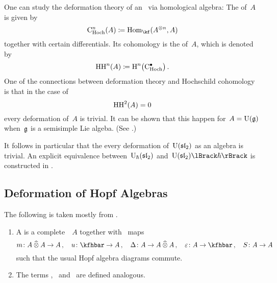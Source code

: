 \documentclass[a4paper, 11pt, oneside]{scrartcl}
\begin{document}
\begin{remark}
  One can study the deformation theory of an~\algebra{$\kf$} via homological algebra:
  The  of~$A$ is given by
  \[
    \CHoch^n(A)
    \defined
    \Hom_{\kf}(A^{\tensor n}, A)
  \]
  together with certain differentials.
  Its cohomology is the  of~$A$, which is denoted by
  \[
    \HH^n(A)
    \defined
    \Homology^n\bigl( \CHoch^\bullet \bigr) \,.
  \]
  One of the connections between deformation theory and Hochschild cohomology is that in the case of
  \[
    \operatorname{HH}^2(A) = 0
  \]
  every deformation of~$A$ is trivial.
  It can be shown that this happen for~$A = \operatorname{U}(\mathfrak{g})$ when~$\mathfrak{g}$ is a semisimple Lie algeba.
  (See \cite[Theorem~2]{gerstenhaber_quantum}.)

  It follows in particular that the every deformation of~$\operatorname{U}(\mathfrak{sl}_2)$ as an algebra is trivial.
  An explicit equivalence between~$\operatorname{U}_{\hbar}(\mathfrak{sl}_2)$ and~$\power{\Univ(\sllie_2)}{\hbar}$ is constructed in \cite[Proposition~4.6.4]{guide_to_quantum_groups}.
\end{remark}



\subsection{Deformation of Hopf Algebras}

The following is taken mostly from \cite[Chapter~6]{guide_to_quantum_groups}.

\begin{definition}
  \label{topological definitions}
  \leavevmode
  \begin{enumerate}
    \item
      A  is a complete~\module{$\kfhbar$}~$A$ together with~\linear{$\kfhbar$} maps
      \[
        m \colon A \ctensor A \to A \,,
        \quad
        u \colon \kfhbar \to A \,,
        \quad
        \Delta \colon A \to A \ctensor A \,,
        \quad
        \varepsilon \colon A \to \kfhbar \,,
        \quad
        S \colon A \to A
      \]
      such that the usual Hopf algebra diagrams commute.
    \item
      The terms ,~ and~ are defined analogous.
  \end{enumerate}
\end{definition}
\end{document}
